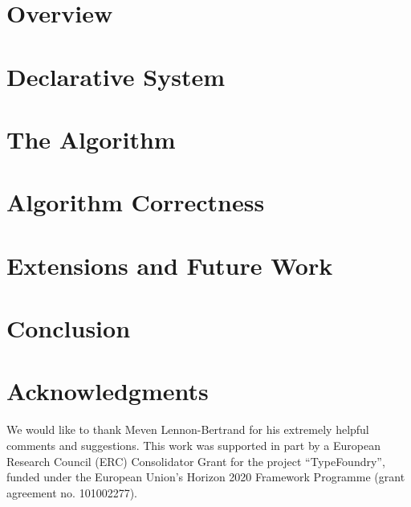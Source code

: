 \documentclass{jfp}
\newcommand{\genDir}{../paper/_gen}
\newcommand{\proofGenDir}{../proofs/_gen}
\begin{document}
\section{Overview}


\section{Declarative System}


\section{The Algorithm}


\section{Algorithm Correctness}


\section{Extensions and Future Work}


\section{Conclusion}


\section*{Acknowledgments}
We would like to thank Meven Lennon-Bertrand for his extremely helpful comments and suggestions. 
This work was supported in part by a European Research Council (ERC) Consolidator Grant
for the project ``TypeFoundry'', funded under the European Union’s Horizon 2020 Framework
Programme (grant agreement no. 101002277).

% 


% 
% 




\clearpage
\begin{appendices}

\end{appendices}

\clearpage
\tableofcontents
\end{document}
